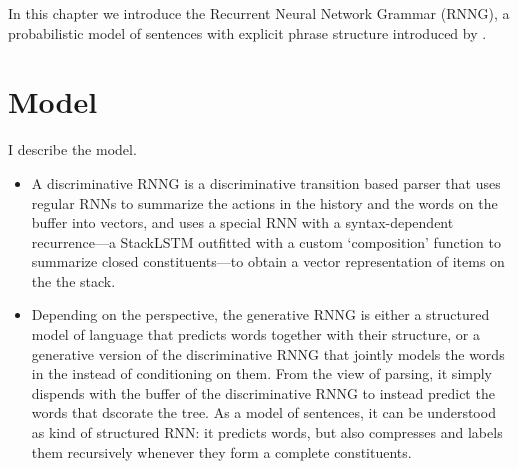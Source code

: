 

In this chapter we introduce the Recurrent Neural Network Grammar (RNNG), a probabilistic model of sentences with explicit phrase structure introduced by \citep{dyer2016rnng}.

\section{Model}
I describe the model.
\begin{itemize}
  \item A discriminative RNNG is a discriminative transition based parser that uses regular RNNs to summarize the actions in the history and the words on the buffer into vectors, and uses a special RNN with a syntax-dependent recurrence---a StackLSTM \citep{ballesteros2017greedy} outfitted with a custom `composition' function to summarize closed constituents---to obtain a vector representation of items on the the stack.
  \item Depending on the perspective, the generative RNNG is either a structured model of language that predicts words together with their structure, or a generative version of the discriminative RNNG that jointly models the words in the instead of conditioning on them. From the view of parsing, it simply dispends with the buffer of the discriminative RNNG to instead predict the words that dscorate the tree. As a model of sentences, it can be understood as kind of structured RNN: it predicts words, but also compresses and labels them recursively whenever they form a complete constituents.
\end{itemize}

